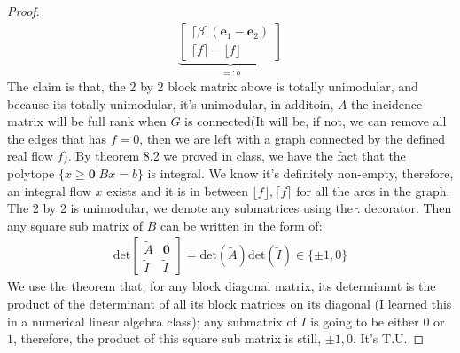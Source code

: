 \documentclass[]{article}
\theoremstyle{definition}
\begin{document}
\begin{proof}
\begin{align}
            \underbrace{\begin{bmatrix}
                \lceil \beta \rceil (\mathbf e_1 -\mathbf e_2)
                \\
                \lceil f \rceil - \lfloor f \rfloor
            \end{bmatrix}}_{=: b}
        \end{align}
        The claim is that, the 2 by 2 block matrix above is totally unimodular, and because its totally unimodular, it's unimodular, in additoin, $A$ the incidence matrix will be full rank when $G$ is connected(It will be, if not, we can remove all the edges that has $f=0$, then we are left with a graph connected by the defined real flow $f$). By theorem 8.2 we proved in class, we have the fact that the polytope $\{x\ge \mathbf 0| Bx = b\}$ is integral. We know it's definitely non-empty, therefore, an integral flow $x$ exists and it is in between $\lfloor f \rfloor, \lceil f\rceil$ for all the arcs in the graph. 
        \\
        The 2 by 2 is unimodular, we denote any submatrices using the $\tilde.$ decorator. Then any square sub matrix of $B$ can be written in the form of: 
        \begin{align}
            \text{det}\begin{bmatrix}
                \tilde{A} & \mathbf 0
                \\
                \tilde{I} & \tilde{I}
            \end{bmatrix}
            =
            \text{det}(\tilde{A})\text{det}(\tilde{I}) 
            \in \{\pm 1, 0\}
        \end{align}
        We use the theorem that, for any block diagonal matrix, its determiannt is the product of the determinant of all its block matrices on its diagonal (I learned this in a numerical linear algebra class); any submatrix of $I$ is going to be either $0$ or $1$, therefore, the product of this square sub matrix is still, $\pm 1, 0$. It's T.U. 
    \end{proof}

    
\end{document}
